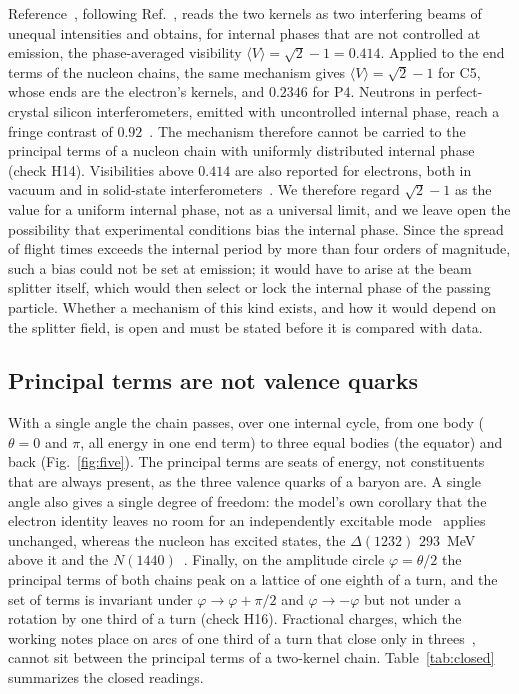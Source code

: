 \documentclass[%
 reprint, amsmath,amssymb, aps, prb, ]{revtex4-2}
\numberwithin{equation}{section}
\begin{document}
Reference~\cite{ref:p38}, following Ref.~\cite{ref:p4}, reads the two kernels as two interfering beams of unequal intensities and obtains, for internal phases that are not controlled at emission, the phase-averaged visibility $\langle V\rangle=\sqrt2-1=0.414$. Applied to the end terms of the nucleon chains, the same mechanism gives $\langle V\rangle=\sqrt2-1$ for C5, whose ends are the electron's kernels, and $0.2346$ for P4. Neutrons in perfect-crystal silicon interferometers, emitted with uncontrolled internal phase, reach a fringe contrast of $0.92$~\cite{ref:huber}. The mechanism therefore cannot be carried to the principal terms of a nucleon chain with uniformly distributed internal phase (check H14). Visibilities above $0.414$ are also reported for electrons, both in vacuum and in solid-state interferometers~\cite{ref:trunks}. We therefore regard $\sqrt2-1$ as the value for a uniform internal phase, not as a universal limit, and we leave open the possibility that experimental conditions bias the internal phase. Since the spread of flight times exceeds the internal period by more than four orders of magnitude, such a bias could not be set at emission; it would have to arise at the beam splitter itself, which would then select or lock the internal phase of the passing particle. Whether a mechanism of this kind exists, and how it would depend on the splitter field, is open and must be stated before it is compared with data.

\subsection{Principal terms are not valence quarks}

With a single angle the chain passes, over one internal cycle, from one body ($\theta=0$ and $\pi$, all energy in one end term) to three equal bodies (the equator) and back (Fig.~\ref{fig:five}). The principal terms are seats of energy, not constituents that are always present, as the three valence quarks of a baryon are. A single angle also gives a single degree of freedom: the model's own corollary that the electron identity leaves no room for an independently excitable mode~\cite{ref:trunks} applies unchanged, whereas the nucleon has excited states, the $\Delta(1232)$ $293$~MeV above it and the $N(1440)$~\cite{ref:pdg}. Finally, on the amplitude circle $\varphi=\theta/2$ the principal terms of both chains peak on a lattice of one eighth of a turn, and the set of terms is invariant under $\varphi\to\varphi+\pi/2$ and $\varphi\to-\varphi$ but not under a rotation by one third of a turn (check H16). Fractional charges, which the working notes place on arcs of one third of a turn that close only in threes~\cite{ref:trunks}, cannot sit between the principal terms of a two-kernel chain. Table~\ref{tab:closed} summarizes the closed readings.
\end{document}
